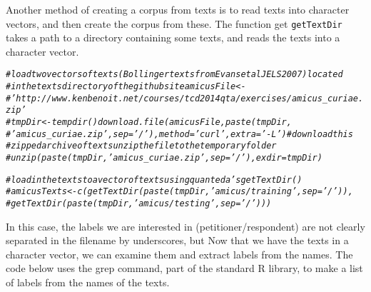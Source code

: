 \documentclass[11pt]{article}\usepackage[]{graphicx}\usepackage[]{color}
\makeatletter
\newcommand{\hlcom}[1]{\textcolor[rgb]{0.678,0.584,0.686}{\textit{#1}}}%
\newenvironment{kframe}{%
 \def\at@end@of@kframe{}%
 \ifinner\ifhmode%
  \def\at@end@of@kframe{\end{minipage}}%
  \begin{minipage}{\columnwidth}%
 \fi\fi%
 \def\FrameCommand##1{\hskip\@totalleftmargin \hskip-\fboxsep
 \colorbox{shadecolor}{##1}\hskip-\fboxsep
     \hskip-\linewidth \hskip-\@totalleftmargin \hskip\columnwidth}%
 \MakeFramed {\advance\hsize-\width
   \@totalleftmargin\z@ \linewidth\hsize
   \@setminipage}}%
 {\par\unskip\endMakeFramed%
 \at@end@of@kframe}
\newenvironment{knitrout}{}{} %
\makeatother
\begin{document}
Another method of creating a corpus from texts is to read texts into character vectors, and then create the corpus from these. The function get \texttt{getTextDir} takes a path to a directory containing some texts, and reads the texts into a character vector.

\begin{knitrout}\footnotesize
{}\color{fgcolor}\begin{kframe}
\begin{alltt}
\hlcom{# load two vectors of texts (Bollinger texts from Evans et al JELS 2007) located}
\hlcom{# in the texts directory of the github site amicusFile <-}
\hlcom{# 'http://www.kenbenoit.net/courses/tcd2014qta/exercises/amicus_curiae.zip'}
\hlcom{# tmpDir <- tempdir() download.file(amicusFile, paste(tmpDir,}
\hlcom{# 'amicus_curiae.zip', sep='/'), method='curl', extra='-L') # download this}
\hlcom{# zipped archive of texts unzip the file to the temporary folder}
\hlcom{# unzip(paste(tmpDir, 'amicus_curiae.zip', sep='/'), exdir=tmpDir)}

\hlcom{# load in the texts to a vector of texts using quanteda's getTextDir()}
\hlcom{# amicusTexts <- c(getTextDir(paste(tmpDir, 'amicus/training', sep='/')),}
\hlcom{# getTextDir(paste(tmpDir, 'amicus/testing', sep='/')))}
\end{alltt}
\end{kframe}
\end{knitrout}


In this case, the labels we are interested in (petitioner/respondent) are not clearly separated in the filename by underscores, but Now that we have the texts in a character vector, we can examine them and extract labels from the names. The code below uses the grep command, part of the standard R library, to make a list of labels from the names of the texts.
\end{document}
